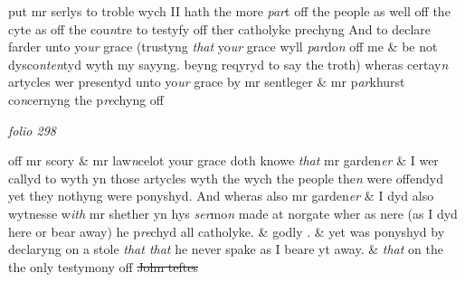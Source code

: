 \documentclass[12pt, a4paper]{book}
\begin{document}
			 put  mr serlys to troble wych II hath the more \textit{par}t off the people as well off the  cyte as off the cou\textit{n}tre to testyfy off ther catholyke prechyng And to declare farder unto yo\textit{ur} grace (trustyng \textit{that} yo\textit{ur} grace wyll \textit{par}do\textit{n} off me \& be not dysco\textit{nten}tyd wyth my sayyng. beyng reqyryd to say the troth) wheras certay\textit{n} artycles wer presentyd unto yo\textit{ur} grace by mr sentleger \& mr p\textit{ar}khurst co\textit{n}cernyng the p\textit{re}chyng off    

\dotfill
					

\textit{folio 298}


off mr scory \& mr law\textit{n}celot your grace doth knowe \textit{that} mr garden\textit{er} \& I wer callyd to wyth yn those artycles wyth the wych the people the\textit{n} were offendyd yet they nothyng were ponyshyd. And wheras also mr garden\textit{er} \& I dyd also wytnesse w\textit{ith} mr shether yn hys \textit{ser}mo\textit{n }made at norgate wher as nere (as I dyd here or bear away) he p\textit{re}chyd all catholyke. \& godly . \& yet was ponyshyd by declaryng on a stole \textit{that that} he never spake as I beare yt away. \& \textit{that} on the the only testymony off \sout{John teftes}
               \textit{}
               
\end{document}
